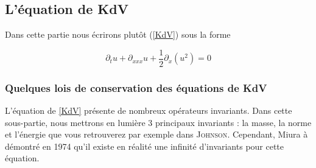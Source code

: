 \documentclass[12pt,a4paper]{article}
\numberwithin{equation}{section}
\begin{document}
\subsection{L'équation de KdV}
Dans cette partie nous écrirons plutôt (\ref{KdV}) sous la forme


\begin{equation*}
    \partial_tu + \partial_{xxx}u +\frac{1}{2}\partial_x(u^2)  = 0
\end{equation*}

\subsubsection{Quelques lois de conservation des équations de KdV}

L'équation de \ref{KdV} présente de nombreux opérateurs invariants. Dans cette sous-partie, nous mettrons en lumière 3 principaux invariants : la masse, la norme et l'énergie que vous retrouverez par exemple dans \textsc{Johnson}\cite{Johnson}. Cependant, Miura à démontré  en 1974 qu'il existe en réalité une infinité d'invariants pour cette équation.
\end{document}
